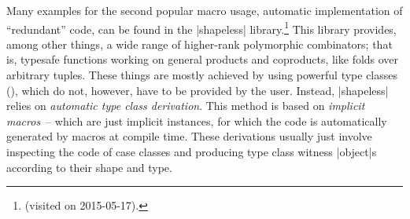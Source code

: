 Many examples for the second popular macro usage, automatic implementation of \enquote{redundant}
code, can be found in the |shapeless|
library.\footnote{\protect{}
  (visited on 2015-05-17).} This library provides, among other things, a wide range of higher-rank
polymorphic combinators; that is, typesafe functions working on general products and coproducts,
like folds over arbitrary tuples. These things are mostly achieved by using powerful type classes
(), which do not, however, have to be provided by the user. Instead,
|shapeless| relies on \emph{automatic type class derivation}. This method is based on \emph{implicit
  macros}~-- which are just implicit instances, for which the code is automatically generated by
macros at compile time. These derivations usually just involve inspecting the code of case classes
and producing type class witness |object|s according to their shape and type.


